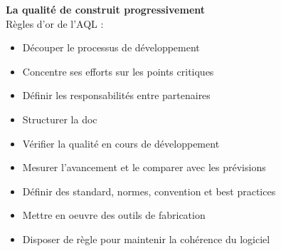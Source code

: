 \textbf{La qualité de construit progressivement}\hfill\\

Règles d’or de l’AQL :
\begin{itemize}
\item Découper le processus de développement
\item Concentre ses efforts sur les points critiques
\item Définir les responsabilités entre partenaires
\item Structurer la doc
\item Vérifier la qualité en cours de développement
\item Mesurer l’avancement et le comparer avec les prévisions
\item Définir des standard, normes, convention et best practices
\item Mettre en oeuvre des outils de fabrication
\item Disposer de règle pour maintenir la cohérence du logiciel
\end{itemize}
